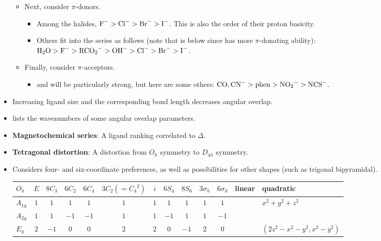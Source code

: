 \documentclass[../notes.tex]{subfiles}
\begin{document}
\begin{itemize}
\begin{itemize}
\begin{itemize}
        \end{itemize}
        \item Next, consider $\pi$-donors.
        \begin{itemize}
            \item Among the halides, $\ce{F-}>\ce{Cl-}>\ce{Br-}>\ce{I-}$. This is also the order of their proton basicity.
            \item Others fit into the series as follows (note that  is below  since  has more $\pi$-donating ability): $\ce{H2O}>\ce{F-}>\ce{RCO2-}>\ce{OH-}>\ce{Cl-}>\ce{Br-}>\ce{I-}$.
        \end{itemize}
        \item Finally, consider $\pi$-acceptors.
        \begin{itemize}
            \item {} and  will be particularly strong, but here are some others: $\ce{CO},\ce{CN-}>\text{phen}>\ce{NO2-}>\ce{NCS-}$.
        \end{itemize}
    \end{itemize}
    \item Increasing ligand size and the corresponding bond length decreases angular overlap.
    \item \textcite{bib:MiesslerFischerTarr} lists the wavenumbers of some angular overlap parameters.
    \item \textbf{Magnetochemical series}: A ligand ranking correlated to $\Delta$.
    \item \textbf{Tetragonal distortion}: A distortion from $O_h$ symmetry to $D_{4h}$ symmetry.
    \item Considers four- and six-coordinate preferences, as well as possibilities for other shapes (such as trigonal bipyramidal).
    \begin{table}[h!]
        \centering
        \small
        \renewcommand{\arraystretch}{1.2}
        \begin{tabular}{l|cccccccccc|l|l}
            $O_h$ & $E$ & $8C_3$ & $6C_2$ & $6C_4$ & $3C_2(={C_4}^2)$ & $i$ & $6S_4$ & $8S_6$ & $3\sigma_h$ & $6\sigma_d$ & linear & quadratic\\
            \hline
            $A_{1g}$ & $1$ & $1$  & $1$  & $1$  & $1$  & $1$  & $1$  & $1$  & $1$  & $1$  & & $x^2+y^2+z^2$\\
            $A_{2g}$ & $1$ & $1$  & $-1$ & $-1$ & $1$  & $1$  & $-1$ & $1$  & $1$  & $-1$ & & \\
            $E_g$    & $2$ & $-1$ & $0$  & $0$  & $2$  & $2$  & $0$  & $-1$ & $2$  & $0$  & & $(2z^2-x^2-y^2,x^2-y^2)$\\

\end{tabular}
\end{table}
\end{itemize}
\end{document}
